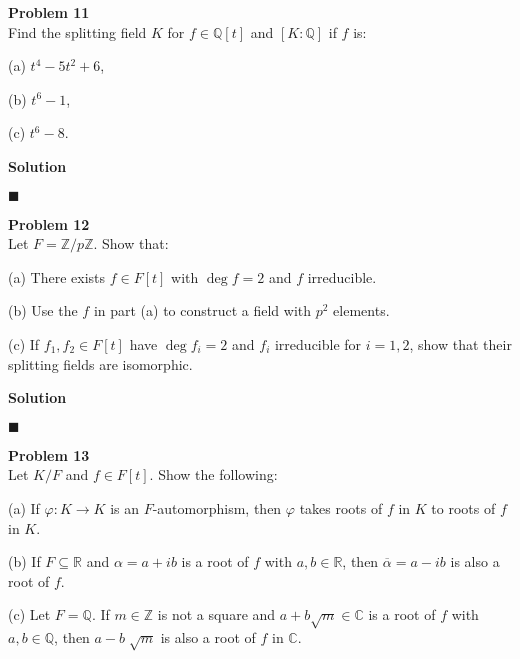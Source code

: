\documentclass{article}
\theoremstyle{definition}
\newenvironment{problem}[2][Problem]
    { \begin{mdframed}[backgroundcolor=gray!20] \textbf{#1 #2} \\}
    {  \end{mdframed}}
\newenvironment{solution}{\textbf{Solution}}{%
     \hfill$\blacksquare$\par\medskip}
\begin{document}
    \begin{problem}{11}
    
    Find the splitting field $K$ for $f \in \mathds{Q}\left[ t \right]$ and $\left[ K : \mathds{Q} \right]$ if $f$ is:
    
    (a) $t^{4} - 5t^{2} + 6$,
    
    (b) $t^{6} - 1$,
    
    (c) $t^{6} - 8$.
    
    \end{problem}
    
    \begin{solution}
    
    
    
    
    \end{solution}
    
    \begin{problem}{12}
    
    Let $F = \mathds{Z} / p\mathds{Z}$. Show that:

    (a) There exists $f \in F\left[ t \right]$ with $\deg f = 2$ and $f$ irreducible. 

    (b) Use the $f$ in part (a) to construct a field with $p^{2}$ elements.

    (c) If $f_1, f_2 \in F\left[ t \right]$ have $\deg f_i = 2$ and $f_i$ irreducible for $i = 1,2$, show that their splitting fields are isomorphic. 
    
    \end{problem}
    
    \begin{solution}
    
    
    
    \end{solution}
    
    \begin{problem}{13}
    
    Let $K / F$ and $f \in F \left[ t \right]$. Show the following:
    
    (a) If $\varphi: K \to  K$ is an $F$-automorphism, then $\varphi$ takes roots of $f$ in $K$ to roots of $f$ in $K$.

    (b) If $F \subseteq \mathds{R}$ and $\alpha = a + ib$ is a root of $f$ with $a,b \in \mathds{R}$, then $\overline{\alpha} = a - ib$ is also a root of $f$.

    (c) Let $F = \mathds{Q}$. If $m \in \mathds{Z}$ is not a square and $a + b\sqrt{m}  \in \mathds{C}$ is a root of $f$ with $a,b \in \mathds{Q}$, then $a-b\sqrt[]{m} $ is also a root of $f$ in $\mathds{C}$.

    \end{problem}
    
\end{document}
